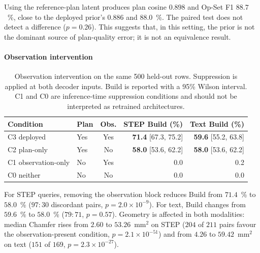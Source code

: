 \documentclass[preprint,12pt]{elsarticle}
\begin{document}
Using the reference-plan latent produces plan cosine $0.898$ and Op-Set F1 $88.7$~\%, close
to the deployed prior's $0.886$ and $88.0$~\%. The paired test does not detect a difference
($p = 0.26$). This suggests that, in this setting, the prior is not the dominant source of
plan-quality error; it is not an equivalence result.

\paragraph{Observation intervention}

\begin{table}[htbp]
  \centering
  \footnotesize
  \caption{Observation intervention on the same 500 held-out rows.
    Suppression is applied at both decoder inputs. Build is reported with a
    95\% Wilson interval. C1 and C0 are inference-time suppression conditions
    and should not be interpreted as retrained architectures.}
  \label{tab:obs_bypass}

  \begin{tabular}{llcrr}
    \toprule
    Condition
     & Plan
     & Obs.
     & STEP Build (\%)
     & Text Build (\%)            \\
    \midrule

    C3 deployed
     & Yes
     & Yes
     & \textbf{71.4} [67.3, 75.2]
     & \textbf{59.6} [55.2, 63.8] \\

    C2 plan-only
     & Yes
     & No
     & \textbf{58.0} [53.6, 62.2]
     & \textbf{58.0} [53.6, 62.2] \\

    C1 observation-only
     & No
     & Yes
     & 0.0
     & 0.2                        \\

    C0 neither
     & No
     & No
     & 0.0
     & 0.0                        \\

    \bottomrule
  \end{tabular}
\end{table}

For STEP queries, removing the observation block reduces Build from $71.4$~\% to
$58.0$~\% ($97:30$ discordant pairs, $p = 2.0\times10^{-9}$). For text, Build changes from
$59.6$~\% to $58.0$~\% ($79:71$, $p = 0.57$). Geometry is affected in both modalities:
median Chamfer rises from $2.60$ to $53.26$~mm$^2$ on STEP ($204$ of $211$ pairs favour
the observation-present condition, $p = 2.1\times10^{-51}$) and from $4.26$ to
$59.42$~mm$^2$ on text ($151$ of $169$, $p = 2.3\times10^{-27}$).
\end{document}
